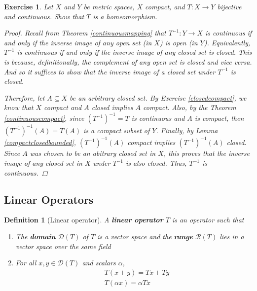 \documentclass[11pt]{article}
\theoremstyle{mystyle}
\newtheorem{defn}{Definition}[section]
\newtheorem{protoexer}{Exercise}[section]
\newenvironment{exer}
{\colorlet{shadecolor}{blue!15}\begin{shaded}\begin{protoexer}}
{\end{protoexer}\end{shaded}}
\newcommand{\0}{\mathbf{0}}
\begin{document}
\begin{exer}
Let $X$ and $Y$ be metric spaces, $X$ compact, and $T: X \longrightarrow Y$ bijective and continuous. Show that $T$ is a homeomorphism.
\begin{proof}
Recall from Theorem \ref{continuousmapping} that $T^{-1}: Y \longrightarrow X$ is continuous if and only if the inverse image of any open set (in $X$) is open (in $Y$). Equivalently, $T^{-1}$ is continuous if and only if the inverse image of any closed set is closed. This is because, definitionally, the complement of any open set is closed and vice versa. And so it suffices to show that the inverse image of a closed set under $T^{-1}$ is closed.

Therefore, let $A \subseteq X$ be an arbitrary closed set. By Exercise \ref{closedcompact}, we know that $X$ compact and $A$ closed implies $A$ compact. Also, by the Theorem \ref{continuouscompact}, since $(T^{-1})^{-1} = T$ is continuous and $A$ is compact, then $(T^{-1})^{-1}(A) = T(A)$ is a compact subset of $Y$. Finally, by Lemma \ref{compactclosedbounded}, $(T^{-1})^{-1}(A)$ compact implies $(T^{-1})^{-1}(A)$ closed. Since $A$ was chosen to be an abitrary closed set in $X$, this proves that the inverse image of any closed set in $X$ under $T^{-1}$ is also closed. Thus, $T^{-1}$ is continuous.
\end{proof}
\end{exer}


\subsection{Linear Operators}

\begin{defn}[Linear operator]\label{linearoperator}
A \textbf{linear operator} $T$ is an operator such that 
\begin{enumerate}
    \item The \textbf{domain} $\mathscr{D}(T)$ of $T$ \textit{is a vector space} and the \textbf{range} $\mathscr{R}(T)$ lies in a vector space \textit{over the same field}
    \item For all $x, y \in \mathscr{D}(T)$ and scalars $\alpha$,
    \begin{align*}
        &T(x + y) = Tx + Ty\\
        &T(\alpha x) = \alpha Tx
    \end{align*}
\end{enumerate}
\end{defn}
\end{document}
